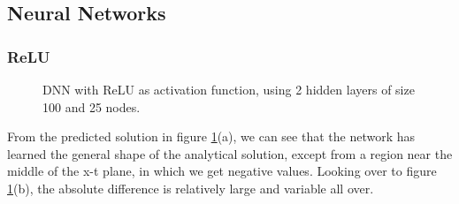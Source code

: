\documentclass{article}
\theoremstyle{definition}
\begin{document}
\subsection{Neural Networks}

\subsubsection{ReLU}

\begin{figure}[H]%
    \centering
    \qquad
    \caption{DNN with ReLU as activation function, using 2 hidden layers of size 100 and 25 nodes.}%
    \label{fig:DNN_ReLU_3d}%
\end{figure}
From the predicted solution in figure \ref{fig:DNN_ReLU_3d}(a), we can see that the network has learned the general shape of the analytical solution, except from a region near the middle of the x-t plane, in which we get negative values. Looking over to figure \ref{fig:DNN_ReLU_3d}(b), the absolute difference is relatively large and variable all over.
\end{document}
